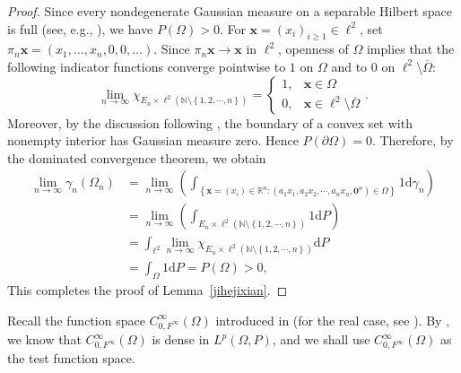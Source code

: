 \documentclass[12pt]{article}
\theoremstyle{plain}
\theoremstyle{definition}
\theoremstyle{remark}
\numberwithin{equation}{section}
\begin{document}
\begin{proof}
	Since every nondegenerate Gaussian measure on a separable Hilbert space is full
	(see, e.g., \cite[Proposition~1.25, p.~21]{DP}), we have $P\left( \Omega \right) >0$.
For $\mathbf{x}=(x_i)_{i\geqslant1}\in\ell^2$, set $\pi_n\mathbf{x}=(x_1,\ldots,x_n,0,0,\ldots)$. Since $\pi_n\mathbf{x}\to\mathbf{x}$ in $\ell^2$, openness of $\Omega$ implies that the following indicator functions converge pointwise to $1$ on $\Omega$ and to $0$ on $\ell^2\setminus\overline{\Omega}$:
	$$\lim_{n\rightarrow \infty} \chi_{E_n \times \ell^{2} \left( \mathbb{N} \setminus \left\{ 1,2,\cdots ,n \right\} \right)} =\begin{cases}1,&\textbf{x} \in \Omega\\ 0,&\textbf{x} \in \ell^{2} \setminus \overline{\Omega}\end{cases}.$$
	Moreover, by the discussion following \cite[Corollary~9, p.~1074]{BBL}, the boundary of a convex set with nonempty interior has Gaussian measure zero. Hence $P\left( \partial \Omega \right) =0$. Therefore, by the dominated convergence theorem, we obtain
	$$\begin{aligned}\lim_{n\rightarrow \infty} \gamma_{n} \left( \Omega_{n} \right)&=\lim_{n\rightarrow \infty} \left( \int_{\left\{ \textbf{x} =\left( x_{i} \right) \in \mathbb{R}^{n} :\left( a_{1}x_{1},a_{2}x_{2},\cdots ,a_{n}x_{n},\textbf{0}^{n} \right) \in \Omega \right\}} 1\mathrm{d} \gamma_{n} \right)\\ &=\lim_{n\rightarrow \infty} \left( \int_{E_n \times \ell^{2} \left( \mathbb{N} \setminus \left\{ 1,2,\cdots ,n \right\} \right)} 1\mathrm{d} P \right)\\ &=\int_{\ell^{2}} \lim_{n\rightarrow \infty} \chi_{E_n \times \ell^{2} \left( \mathbb{N} \setminus \left\{ 1,2,\cdots ,n \right\} \right)} \mathrm{d} P\\ &=\int_{\Omega} 1\mathrm{d}P=P\left( \Omega \right) >0,\end{aligned}$$
	This completes the proof of Lemma~\ref{jihejixian}.
\end{proof}
Recall the function space $C_{0,F^{\infty}}^{\infty}\left( \Omega \right)$ introduced in \cite[p.~7]{WYZ1} (for the real case, see \cite[p.~8]{WYZZ}). By \cite[Lemma~3.1, p.~17]{WYZ1}, we know that $C_{0,F^{\infty}}^{\infty}\left( \Omega \right)$ is dense in $L^{p}\left( \Omega ,P \right)$, and we shall use $C_{0,F^{\infty}}^{\infty}\left( \Omega \right)$ as the test function space. 
\end{document}
